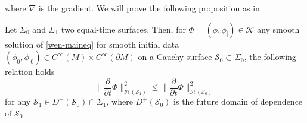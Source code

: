 where $\nabla$ is the gradient.
We will prove the following proposition as in~\cite{Zahn2016}
\begin{proposition}\label{wen-propcau}
Let $\Sigma_0$ and $\Sigma_1$ two equal-time surfaces. 
Then, for $\Phi = (\phi, \phi_|) \in \mathcal{K}$ any smooth solution of \cref{wen-maineq} for smooth initial data $(\phi_0, \phi_{|0}) \in C^\infty(M) \times C^\infty(\partial M)$ on a Cauchy surface $\mathcal{S}_0 \subset \Sigma_0$,
the following relation holds
\begin{equation}\label{wen-causal}
\big\| \frac{\partial}{\partial t} \Phi \big\|_{\mathcal{H}(\mathcal{S}_1)}^2
\leq 
\big\| \frac{\partial}{\partial t} \Phi \big\|_{\mathcal{H}(\mathcal{S}_0)}^2
\end{equation}
for any $\mathcal{S}_1 \in D^+(\mathcal{S}_0)\cap\Sigma_1$, where $D^+(\mathcal{S}_0)$ is the future domain of dependence of $\mathcal{S}_0$.
\end{proposition}
